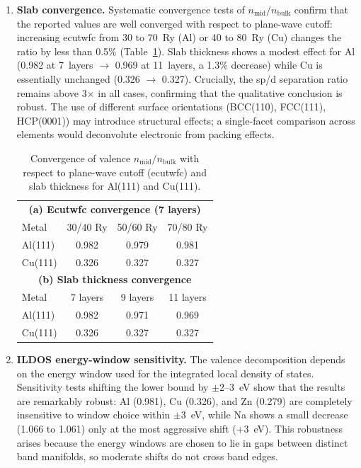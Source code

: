 \documentclass[twocolumn,showpacs,preprintnumbers,amsmath,amssymb,prb]{revtex4-2}
\begin{document}
\begin{enumerate}
  \item \textbf{Slab convergence.}
    Systematic convergence tests of
    $n_\mathrm{mid}/n_\mathrm{bulk}$ confirm that the
    reported values are well converged with respect to
    plane-wave cutoff: increasing ecutwfc from 30 to 70~Ry
    (Al) or 40 to 80~Ry (Cu) changes the ratio by less than
    0.5\% (Table~\ref{tab:convergence}).
    Slab thickness shows a modest effect for Al
    (0.982 at 7~layers $\to$ 0.969 at 11~layers, a 1.3\%
    decrease) while Cu is essentially unchanged
    (0.326 $\to$ 0.327).
    Crucially, the sp/d separation ratio remains above
    3$\times$ in all cases, confirming that the qualitative
    conclusion is robust.
    The use of different surface orientations
    (BCC(110), FCC(111), HCP(0001)) may introduce
    structural effects; a single-facet comparison across
    elements would deconvolute electronic from packing effects.

\begin{table}[htb]
  \centering
  \caption{Convergence of valence $n_\mathrm{mid}/n_\mathrm{bulk}$
    with respect to plane-wave cutoff (ecutwfc) and slab thickness
    for Al(111) and Cu(111).}
  \label{tab:convergence}
  \begin{ruledtabular}
  \begin{tabular}{lccc}
    \multicolumn{4}{c}{\textbf{(a) Ecutwfc convergence (7 layers)}} \\
    Metal & 30/40 Ry & 50/60 Ry & 70/80 Ry \\
    \hline
    Al(111) & 0.982 & 0.979 & 0.981 \\
    Cu(111) & 0.326 & 0.327 & 0.327 \\[6pt]
    \multicolumn{4}{c}{\textbf{(b) Slab thickness convergence}} \\
    Metal & 7 layers & 9 layers & 11 layers \\
    \hline
    Al(111) & 0.982 & 0.971 & 0.969 \\
    Cu(111) & 0.326 & 0.327 & 0.327 \\
  \end{tabular}
  \end{ruledtabular}
\end{table}

  \item \textbf{ILDOS energy-window sensitivity.}
    The valence decomposition depends on the energy window
    used for the integrated local density of states.
    Sensitivity tests shifting the lower bound by
    $\pm 2$--$3$~eV show that the results are remarkably
    robust: Al (0.981), Cu (0.326), and Zn (0.279) are
    completely insensitive to window choice within
    $\pm 3$~eV, while Na shows a small decrease (1.066
    to 1.061) only at the most aggressive shift (+3~eV).
    This robustness arises because the energy windows
    are chosen to lie in gaps between distinct band
    manifolds, so moderate shifts do not cross band edges.


\end{enumerate}
\end{document}
